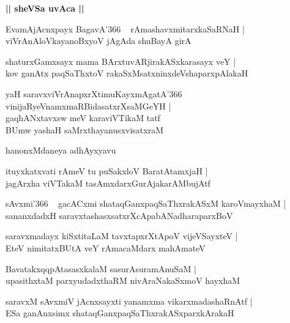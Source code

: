 \documentclass[twoside,12pt,openright]{book}
\newcounter{shloka}[chapter]
\def\uvaca#1{\centerline{{\large\textbf{#1}}}}
\begin{document}
\uvaca{|| sheVSa uvAca ||}

\begin{shloka}%
EvamAjAcnxpayx BagavA\char'366 ~ rAmashavxmitarxkaSaRNaH |\\
viVrAnAloVkayanoBxyoV jAgAda shuBayA girA
\end{shloka}

\begin{shloka}%
shaturxGamxsayx mama BArxtuvARjirakASxkarasayx veY |\\
kov ganAtx paqSaThxtoV rakaSxMsatxninxdeVshaparxpAlakaH
\end{shloka}

\begin{shloka}%
yaH saravxviVrAnapxrXtimuKayxmAgatA\char'366 ~\\
vinijaRyeVnamxmaRBidasatxrXsaMGeYH |\\
gaqhANxtavxsw meV karaviVTikaM tatf \\
BUmw yashaH saMrxthayanusxvisatxraM 
\end{shloka}

\begin{center}
hanonxMdaneya adhAyxyavu
\end{center}

\begin{shloka}%
ituyxkatxvati rAmeV tu puSakxloV BaratAtamxjaH |\\
jagArxha viVTakaM tasAmxdarxGurAjakarAMbujAtf 
\end{shloka}

\begin{shloka}%
sAvxmi\char'366 ~ gacACxmi shataqGanxpaqSaThxrakASxM karoVmayxhaM |\\
sananxdadxH saravxtashasxsatxrXcApabANadharaparxBoV
\end{shloka}

\begin{shloka}%
saravxmadayx kiSxtitaLaM tavxtapxrXtApoV vijeVSayxteV |\\
EteV nimitatxBUtA veY rAmacaMdarx mahAmateV 
\end{shloka}

\begin{shloka}%
BavatakxqqpAtasasxkalaM sasurAsuramAnuSaM |\\
upasithxtaM parxyudadxthaRM nivAraNakaSxmoV hayxhaM 
\end{shloka}

\begin{shloka}%
saravxM sAvxmiV jAcnxsayxti yanamxma vikarxmadashaRnAtf |\\
ESa ganAnxsimx shataqGanxpaqSaThxrakASxparxkArakaH
\end{shloka}
\end{document}
